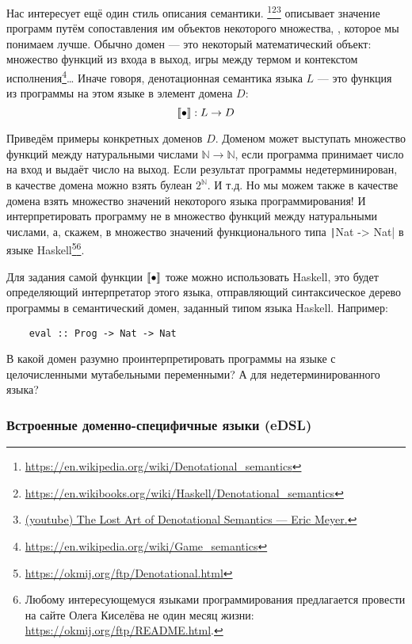 Нас интересует ещё один стиль описания семантики.
\footnote{\url{https://en.wikipedia.org/wiki/Denotational_semantics}}\footnote{\url{https://en.wikibooks.org/wiki/Haskell/Denotational_semantics}}\footnote{\href{https://youtu.be/pQyH0p-XJzE?si=TUEzrpHhJZfO7dTF}{(youtube) The Lost Art of Denotational Semantics --- Eric Meyer.}} описывает значение программ путём сопоставления им объектов некоторого множества, , которое мы понимаем лучше.
Обычно домен --- это некоторый математический объект: множество функций из входа в выход, игры между термом и контекстом исполнения\footnote{\url{https://en.wikipedia.org/wiki/Game_semantics}}\ldots
Иначе говоря, денотационная семантика языка $L$ --- это функция из программы на этом языке в элемент домена $D$:
\[
    \llbracket{\bullet}\rrbracket : L \to D
\]

Приведём примеры конкретных доменов $D$.
Доменом может выступать множество функций между натуральными числами $\mathbb{N}\to\mathbb{N}$, если программа принимает число на вход и выдаёт число на выход.
Если результат программы недетерминирован, в качестве домена можно взять булеан $2^\mathbb{N}$.
И т.д.
Но мы можем также в качестве домена взять множество значений некоторого языка программирования!
И интерпретировать программу не в множество функций между натуральными числами, а, скажем, в множество значений функционального типа \texttt|Nat -> Nat| в языке Haskell\footnote{\url{https://okmij.org/ftp/Denotational.html}}\footnote{Любому интересующемуся языками программирования предлагается провести на сайте Олега Киселёва не один месяц жизни: \url{https://okmij.org/ftp/README.html}.}.

Для задания самой функции $\llbracket{\bullet}\rrbracket$ тоже можно использовать Haskell, это будет определяющий интерпретатор этого языка, отправляющий синтаксическое дерево программы в семантический домен, заданный типом языка Haskell.
Например:
\begin{verbatim}
    eval :: Prog -> Nat -> Nat
\end{verbatim}

\begin{task}
    В какой домен разумно проинтерпретировать программы на языке с целочисленными мутабельными переменными?
    А для недетерминированного языка?
\end{task}

\subsubsection{Встроенные доменно-специфичные языки (eDSL)} \label{subsubsec:edsl}

